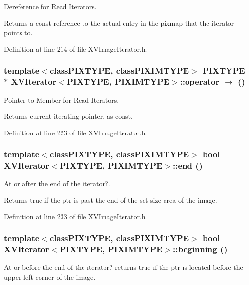 Dereference for Read Iterators.

Returns a const reference to the actual entry in the pixmap that the iterator points to. 

Definition at line 214 of file XVImage\-Iterator.h.\label{XVIterator_a15}
\hypertarget{class_XVIterator_a15}{
\subsubsection[operator->]{\setlength{\rightskip}{0pt plus 5cm}template$<$classPIXTYPE, classPIXIMTYPE$>$ PIXTYPE $\ast$ XVIterator$<$PIXTYPE, PIXIMTYPE$>$::operator $\rightarrow$  ()}}


Pointer to Member for Read Iterators.

Returns current iterating pointer, as const. 

Definition at line 223 of file XVImage\-Iterator.h.\label{XVIterator_a16}
\hypertarget{class_XVIterator_a16}{
\subsubsection[end]{\setlength{\rightskip}{0pt plus 5cm}template$<$classPIXTYPE, classPIXIMTYPE$>$ bool XVIterator$<$PIXTYPE, PIXIMTYPE$>$::end ()}}


At or after the end of the iterator?.

Returns true if the ptr is past the end of the set size  area of the image. 

Definition at line 233 of file XVImage\-Iterator.h.\label{XVIterator_a17}
\hypertarget{class_XVIterator_a17}{
\subsubsection[beginning]{\setlength{\rightskip}{0pt plus 5cm}template$<$classPIXTYPE, classPIXIMTYPE$>$ bool XVIterator$<$PIXTYPE, PIXIMTYPE$>$::beginning ()}}


At or before the end of the iterator? returns true if the ptr is located before the upper left corner of the image.



